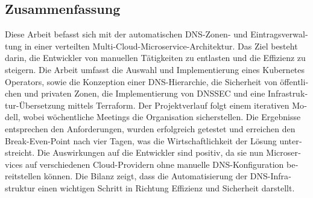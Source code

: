 \begin{otherlanguage}{ngerman}
	\chapter*{Zusammenfassung}
	Diese Arbeit befasst sich mit der automatischen DNS-Zonen- und Eintragsverwaltung in einer verteilten Multi-Cloud-Microservice-Architektur.
	\medskip
	Das Ziel besteht darin, die Entwickler von manuellen Tätigkeiten zu entlasten und die Effizienz zu steigern.
	Die Arbeit umfasst die Auswahl und Implementierung eines Kubernetes Operators, sowie die Konzeption einer DNS-Hierarchie,
	die Sicherheit von öffentlichen und privaten Zonen, die Implementierung von DNSSEC und eine Infrastruktur-Übersetzung mittels Terraform.
	\medskip
	Der Projektverlauf folgt einem iterativen Modell, wobei wöchentliche Meetings die Organisation sicherstellen.
	\medskip
	Die Ergebnisse entsprechen den Anforderungen, wurden erfolgreich getestet und erreichen den Break-Even-Point nach vier Tagen, was die Wirtschaftlichkeit der Lösung unterstreicht.
	Die Auswirkungen auf die Entwickler sind positiv, da sie nun Microservices auf verschiedenen Cloud-Providern ohne manuelle DNS-Konfiguration bereitstellen können.
	\medskip
	Die Bilanz zeigt, dass die Automatisierung der DNS-Infrastruktur einen wichtigen Schritt in Richtung Effizienz und Sicherheit darstellt.
\end{otherlanguage}
